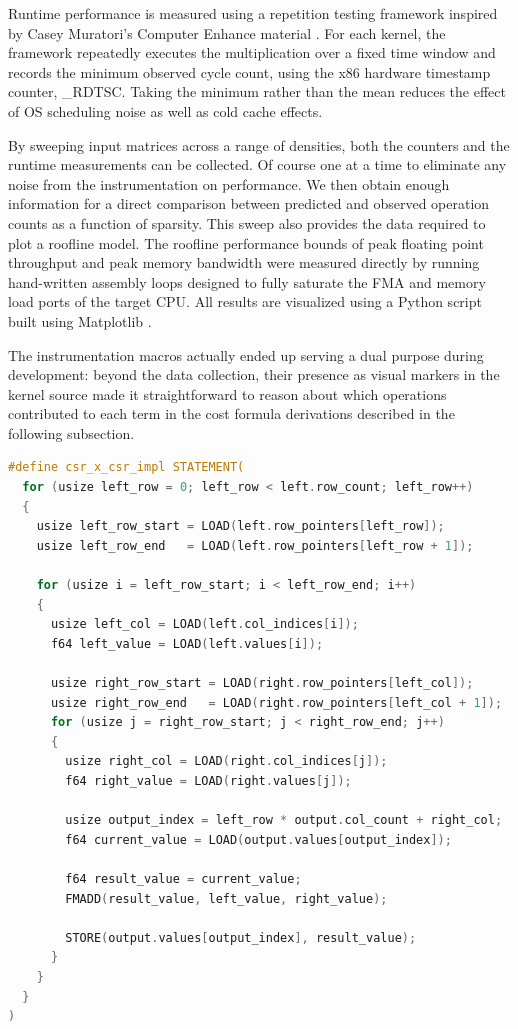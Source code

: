 \documentclass[sigconf, review, anonymous]{acmart}
\begin{document}
Runtime performance is measured using a repetition testing framework inspired by Casey Muratori's Computer Enhance material \cite{muratori}. For each kernel, the framework repeatedly executes the multiplication over a fixed time window and records the minimum observed cycle count, using the x86 hardware timestamp counter, \_RDTSC. Taking the minimum rather than the mean reduces the effect of OS scheduling noise as well as cold cache effects.

By sweeping input matrices across a range of densities, both the counters and the runtime measurements can be collected. Of course one at a time to eliminate any noise from the instrumentation on performance. We then obtain enough information for a direct comparison between predicted and observed operation counts as a function of sparsity. This sweep also provides the data required to plot a roofline model. The roofline performance bounds of peak floating point throughput and peak memory bandwidth were measured directly by running hand-written assembly loops designed to fully saturate the FMA and memory load ports of the target CPU. All results are visualized using a Python script built using Matplotlib \cite{matplotlib}.

The instrumentation macros actually ended up serving a dual purpose during development: beyond the data collection, their presence as visual markers in the kernel source made it straightforward to reason about which operations contributed to each term in the cost formula derivations described in the following subsection.

\begin{lstlisting}[float, language=C, caption={Implementation macro example, backslashes ommitted for formatting, STATEMENT expands to a do while()}]
#define csr_x_csr_impl STATEMENT(
  for (usize left_row = 0; left_row < left.row_count; left_row++)
  {
    usize left_row_start = LOAD(left.row_pointers[left_row]);
    usize left_row_end   = LOAD(left.row_pointers[left_row + 1]);

    for (usize i = left_row_start; i < left_row_end; i++)
    {
      usize left_col = LOAD(left.col_indices[i]);
      f64 left_value = LOAD(left.values[i]);

      usize right_row_start = LOAD(right.row_pointers[left_col]);
      usize right_row_end   = LOAD(right.row_pointers[left_col + 1]);
      for (usize j = right_row_start; j < right_row_end; j++)
      {
        usize right_col = LOAD(right.col_indices[j]);
        f64 right_value = LOAD(right.values[j]);

        usize output_index = left_row * output.col_count + right_col;
        f64 current_value = LOAD(output.values[output_index]);

        f64 result_value = current_value;
        FMADD(result_value, left_value, right_value);

        STORE(output.values[output_index], result_value);
      }
    }
  }
)
\end{lstlisting}
\end{document}
